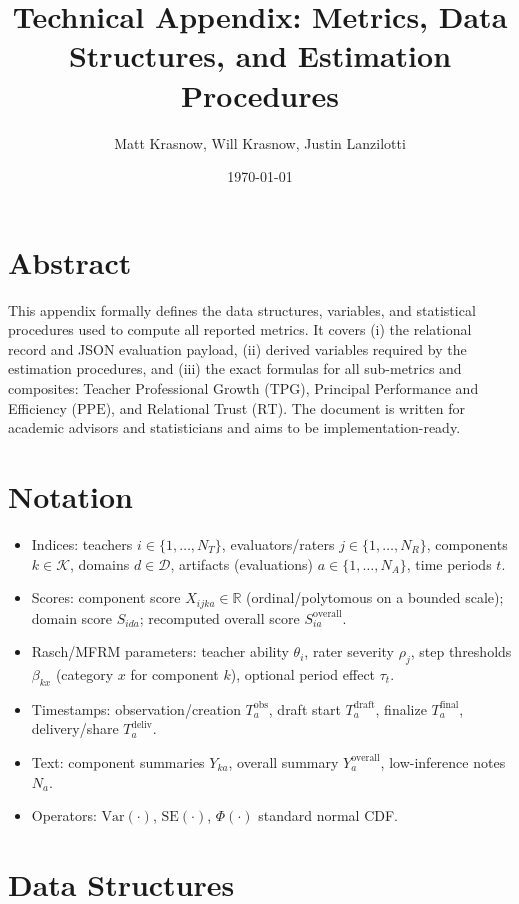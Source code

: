 \documentclass[11pt]{article}
\title{Technical Appendix: Metrics, Data Structures, and Estimation Procedures}
\author{Matt Krasnow, Will Krasnow, Justin Lanzilotti}
\date{\today}
\newcommand{\TPG}{\mathrm{TPG}}
\newcommand{\PPE}{\mathrm{PPE}}
\newcommand{\RT}{\mathrm{RT}}
\newcommand{\Var}{\mathrm{Var}}
\newcommand{\SE}{\mathrm{SE}}
\begin{document}
\maketitle
\tableofcontents

\section*{Abstract}
This appendix formally defines the data structures, variables, and statistical procedures used to compute all reported metrics. It covers (i) the relational record and JSON evaluation payload, (ii) derived variables required by the estimation procedures, and (iii) the exact formulas for all sub-metrics and composites: Teacher Professional Growth ($\TPG$), Principal Performance and Efficiency ($\PPE$), and Relational Trust ($\RT$). The document is written for academic advisors and statisticians and aims to be implementation-ready.

\section{Notation}
\begin{itemize}[leftmargin=2em]
  \item Indices: teachers $i \in \{1,\dots,N_T\}$, evaluators/raters $j \in \{1,\dots,N_R\}$, components $k \in \mathcal{K}$, domains $d \in \mathcal{D}$, artifacts (evaluations) $a \in \{1,\dots,N_A\}$, time periods $t$.
  \item Scores: component score $X_{i j k a} \in \mathbb{R}$ (ordinal/polytomous on a bounded scale); domain score $S_{i d a}$; recomputed overall score $S^{\mathrm{overall}}_{i a}$.
  \item Rasch/MFRM parameters: teacher ability $\theta_i$, rater severity $\rho_j$, step thresholds $\beta_{k x}$ (category $x$ for component $k$), optional period effect $\tau_t$.
  \item Timestamps: observation/creation $T^{\mathrm{obs}}_a$, draft start $T^{\mathrm{draft}}_a$, finalize $T^{\mathrm{final}}_a$, delivery/share $T^{\mathrm{deliv}}_a$.
  \item Text: component summaries $Y_{k a}$, overall summary $Y^{\mathrm{overall}}_a$, low-inference notes $N_a$.
  \item Operators: $\Var(\cdot)$, $\SE(\cdot)$, $\Phi(\cdot)$ standard normal CDF.
\end{itemize}

\section{Data Structures}
\end{document}
